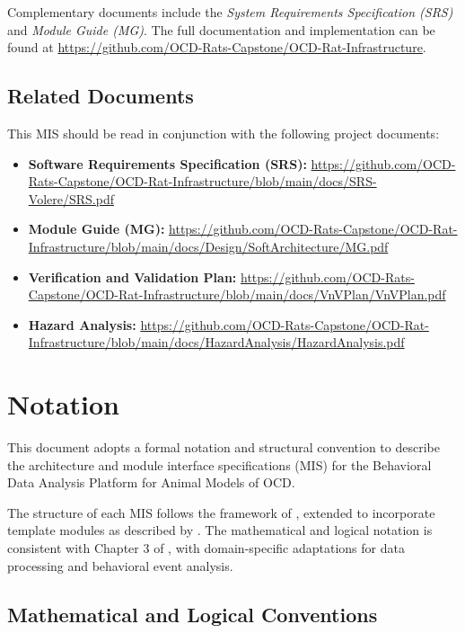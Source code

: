 \documentclass[12pt, titlepage]{article}
\begin{document}
Complementary documents include the \textit{System Requirements Specification (SRS)} and \textit{Module Guide (MG)}.  
The full documentation and implementation can be found at  
\url{https://github.com/OCD-Rats-Capstone/OCD-Rat-Infrastructure}.

\subsection{Related Documents}

This MIS should be read in conjunction with the following project documents:
\begin{itemize}
  \item \textbf{Software Requirements Specification (SRS):} \url{https://github.com/OCD-Rats-Capstone/OCD-Rat-Infrastructure/blob/main/docs/SRS-Volere/SRS.pdf}
  \item \textbf{Module Guide (MG):} \url{https://github.com/OCD-Rats-Capstone/OCD-Rat-Infrastructure/blob/main/docs/Design/SoftArchitecture/MG.pdf}
  \item \textbf{Verification and Validation Plan:} \url{https://github.com/OCD-Rats-Capstone/OCD-Rat-Infrastructure/blob/main/docs/VnVPlan/VnVPlan.pdf}
  \item \textbf{Hazard Analysis:} \url{https://github.com/OCD-Rats-Capstone/OCD-Rat-Infrastructure/blob/main/docs/HazardAnalysis/HazardAnalysis.pdf}
\end{itemize}



\section{Notation}

This document adopts a formal notation and structural convention to describe the architecture and module interface specifications (MIS) for the Behavioral Data Analysis Platform for Animal Models of OCD. 

The structure of each MIS follows the framework of \citet{HoffmanAndStrooper1995}, extended to incorporate template modules as described by \citet{GhezziEtAl2003}. The mathematical and logical notation is consistent with Chapter 3 of \citet{HoffmanAndStrooper1995}, with domain-specific adaptations for data processing and behavioral event analysis.

\subsection*{Mathematical and Logical Conventions}
\end{document}
